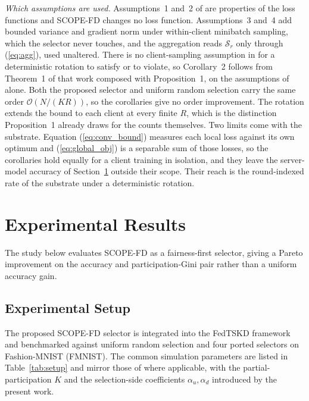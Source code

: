 \documentclass[journal]{IEEEtran}
\newcommand{\rev}[1]{{\color{blue}#1}}
\begin{document}
\rev{\textit{Which assumptions are used.} Assumptions~1 and~2 of \cite{mu2024fedtskd} are properties of the loss functions and SCOPE-FD changes no loss function. Assumptions~3 and~4 add bounded variance and gradient norm under within-client minibatch sampling, which the selector never touches, and the aggregation reads $\mathcal{S}_r$ only through (\ref{eq:agg}), used unaltered. There is no client-sampling assumption in \cite{mu2024fedtskd} for a deterministic rotation to satisfy or to violate, so Corollary~2 follows from Theorem~1 of that work composed with Proposition~1, on the assumptions of \cite{mu2024fedtskd} alone. Both the proposed selector and uniform random selection carry the same order $\mathcal{O}(N/(KR))$, so the corollaries give no order improvement. The rotation extends the bound to each client at every finite $R$, which is the distinction Proposition~1 already draws for the counts themselves. Two limits come with the substrate. Equation (\ref{eq:conv_bound}) measures each local loss against its own optimum and (\ref{eq:global_obj}) is a separable sum of those losses, so the corollaries hold equally for a client training in isolation, and they leave the server-model accuracy of Section~\ref{sec:experiments} outside their scope. Their reach is the round-indexed rate of the substrate under a deterministic rotation.}

\section{Experimental Results}
\label{sec:experiments}

The study below evaluates SCOPE-FD as a fairness-first selector, giving a Pareto improvement on the accuracy and participation-Gini pair rather than a uniform accuracy gain.

\subsection{Experimental Setup}
\label{ssec:exp-setup}

The proposed SCOPE-FD selector is integrated into the FedTSKD framework \cite{mu2024fedtskd} and benchmarked against uniform random selection and four ported selectors on Fashion-MNIST (FMNIST). The common simulation parameters are listed in Table~\ref{tab:setup} and mirror those of \cite{mu2024fedtskd} where applicable, with the partial-participation $K$ and the selection-side coefficients $\alpha_u, \alpha_d$ introduced by the present work.
\end{document}
